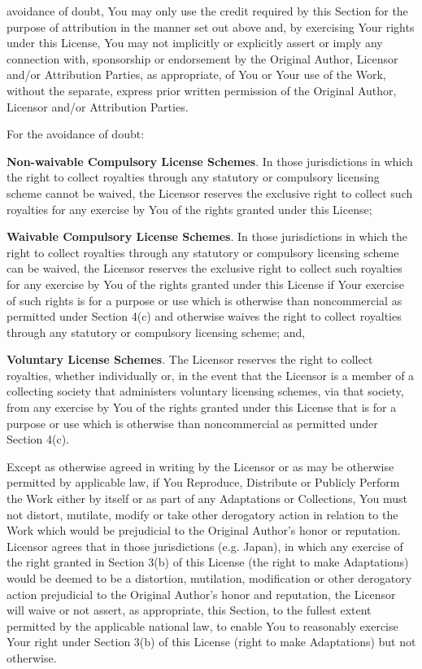 \begin{doclicense@enumerate}
avoidance of doubt, You may only use the credit required
by this Section for the purpose of attribution in the
manner set out above and, by exercising Your rights under
this License, You may not implicitly or explicitly assert
or imply any connection with, sponsorship or endorsement
by the Original Author, Licensor and/or Attribution
Parties, as appropriate, of You or Your use of the Work,
without the separate, express prior written permission of
the Original Author, Licensor and/or Attribution
Parties.
\item 
\par For the avoidance of doubt:
\begin{doclicense@enumerate}
\item \textbf{Non-waivable Compulsory License
Schemes}. In those jurisdictions in which the
right to collect royalties through any statutory or
compulsory licensing scheme cannot be waived, the
Licensor reserves the exclusive right to collect such
royalties for any exercise by You of the rights
granted under this License;
\item \textbf{Waivable Compulsory License
Schemes}. In those jurisdictions in which the
right to collect royalties through any statutory or
compulsory licensing scheme can be waived, the
Licensor reserves the exclusive right to collect such
royalties for any exercise by You of the rights
granted under this License if Your exercise of such
rights is for a purpose or use which is otherwise
than noncommercial as permitted under Section 4(c)
and otherwise waives the right to collect royalties
through any statutory or compulsory licensing scheme;
and,
\item \textbf{Voluntary License Schemes}. The
Licensor reserves the right to collect royalties,
whether individually or, in the event that the
Licensor is a member of a collecting society that
administers voluntary licensing schemes, via that
society, from any exercise by You of the rights
granted under this License that is for a purpose or
use which is otherwise than noncommercial as
permitted under Section 4(c).
\end{doclicense@enumerate}

\item Except as otherwise agreed in writing by the Licensor
or as may be otherwise permitted by applicable law, if
You Reproduce, Distribute or Publicly Perform the Work
either by itself or as part of any Adaptations or
Collections, You must not distort, mutilate, modify or
take other derogatory action in relation to the Work
which would be prejudicial to the Original Author's honor
or reputation. Licensor agrees that in those
jurisdictions (e.g. Japan), in which any exercise of the
right granted in Section 3(b) of this License (the right
to make Adaptations) would be deemed to be a distortion,
mutilation, modification or other derogatory action
 prejudicial to the Original Author's honor and
reputation, the Licensor will waive or not assert, as
appropriate, this Section, to the fullest extent
permitted by the applicable national law, to enable You
to reasonably exercise Your right under Section 3(b) of
this License (right to make Adaptations) but not
otherwise.
\end{doclicense@enumerate}
